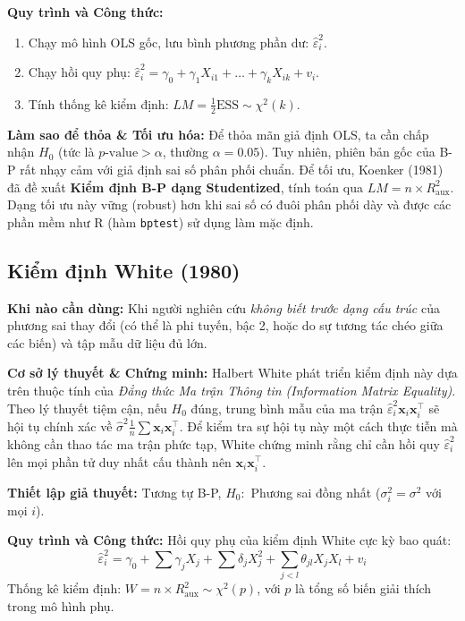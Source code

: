 \documentclass[12pt, a4paper]{article}
\begin{document}
	\textbf{Quy trình và Công thức:}
	\begin{enumerate}
		\item Chạy mô hình OLS gốc, lưu bình phương phần dư: $\hat{\varepsilon}_i^2$.
		\item Chạy hồi quy phụ: $\hat{\varepsilon}_i^2 = \gamma_0 + \gamma_1 X_{i1} + \dots + \gamma_k X_{ik} + v_i$.
		\item Tính thống kê kiểm định: $LM = \frac{1}{2}\text{ESS} \sim \chi^2(k)$. 
	\end{enumerate}
	\textbf{Làm sao để thỏa \& Tối ưu hóa:} Để thỏa mãn giả định OLS, ta cần chấp nhận $H_0$ (tức là $p\text{-value} > \alpha$, thường $\alpha = 0.05$). Tuy nhiên, phiên bản gốc của B-P rất nhạy cảm với giả định sai số phân phối chuẩn. Để tối ưu, Koenker (1981) \cite{koenker1981} đã đề xuất \textbf{Kiểm định B-P dạng Studentized}, tính toán qua $LM = n \times R^2_{\text{aux}}$. Dạng tối ưu này vững (robust) hơn khi sai số có đuôi phân phối dày và được các phần mềm như R (hàm \texttt{bptest}) sử dụng làm mặc định.
	
	\subsection{Kiểm định White (1980)}
	\textbf{Khi nào cần dùng:} Khi người nghiên cứu \textit{không biết trước dạng cấu trúc} của phương sai thay đổi (có thể là phi tuyến, bậc 2, hoặc do sự tương tác chéo giữa các biến) và tập mẫu dữ liệu đủ lớn.
	
	\textbf{Cơ sở lý thuyết \& Chứng minh:} Halbert White \cite{white1980} phát triển kiểm định này dựa trên thuộc tính của \textit{Đẳng thức Ma trận Thông tin (Information Matrix Equality)}. Theo lý thuyết tiệm cận, nếu $H_0$ đúng, trung bình mẫu của ma trận $\hat{\varepsilon}_i^2 \mathbf{x}_i \mathbf{x}_i^\top$ sẽ hội tụ chính xác về $\hat{\sigma}^2 \frac{1}{n}\sum \mathbf{x}_i \mathbf{x}_i^\top$. Để kiểm tra sự hội tụ này một cách thực tiễn mà không cần thao tác ma trận phức tạp, White chứng minh rằng chỉ cần hồi quy $\hat{\varepsilon}_i^2$ lên mọi phần tử duy nhất cấu thành nên $\mathbf{x}_i \mathbf{x}_i^\top$.
	
	\textbf{Thiết lập giả thuyết:} Tương tự B-P, $H_0:$ Phương sai đồng nhất ($\sigma_i^2 = \sigma^2$ với mọi $i$).
	
	\textbf{Quy trình và Công thức:}
	Hồi quy phụ của kiểm định White cực kỳ bao quát:
	\begin{equation}
		\hat{\varepsilon}_i^2 = \gamma_0 + \sum \gamma_j X_j + \sum \delta_j X_j^2 + \sum_{j<l} \theta_{jl} X_j X_l + v_i
	\end{equation}
	Thống kê kiểm định: $W = n \times R^2_{\text{aux}} \sim \chi^2(p)$, với $p$ là tổng số biến giải thích trong mô hình phụ.
	
\end{document}
